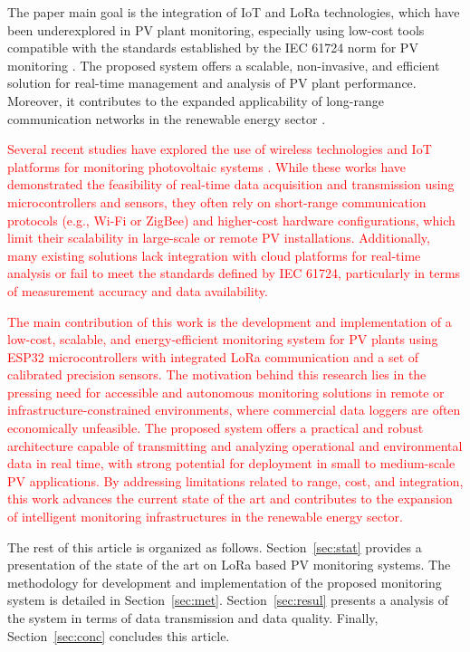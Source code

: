 The paper main goal is the integration of IoT and LoRa technologies, which have been underexplored in PV plant monitoring, especially using low-cost tools compatible with the standards established by the IEC 61724 norm for PV monitoring \cite{IEC61724}. The proposed system offers a scalable, non-invasive, and efficient solution for real-time management and analysis of PV plant performance. Moreover, it contributes to the expanded applicability of long-range communication networks in the renewable energy sector \cite{de2017monitoring,ansari2021review}.

\textcolor{red}{
Several recent studies have explored the use of wireless technologies and IoT platforms for monitoring photovoltaic systems \cite{dupont2018internet, pereira2019iot, liang2020performance, araripe2024monitoramento}. While these works have demonstrated the feasibility of real-time data acquisition and transmission using microcontrollers and sensors, they often rely on short-range communication protocols (e.g., Wi-Fi or ZigBee) and higher-cost hardware configurations, which limit their scalability in large-scale or remote PV installations. Additionally, many existing solutions lack integration with cloud platforms for real-time analysis or fail to meet the standards defined by IEC 61724, particularly in terms of measurement accuracy and data availability.
}

\textcolor{red}{
The main contribution of this work is the development and implementation of a low-cost, scalable, and energy-efficient monitoring system for PV plants using ESP32 microcontrollers with integrated LoRa communication and a set of calibrated precision sensors. The motivation behind this research lies in the pressing need for accessible and autonomous monitoring solutions in remote or infrastructure-constrained environments, where commercial data loggers are often economically unfeasible. The proposed system offers a practical and robust architecture capable of transmitting and analyzing operational and environmental data in real time, with strong potential for deployment in small to medium-scale PV applications. By addressing limitations related to range, cost, and integration, this work advances the current state of the art and contributes to the expansion of intelligent monitoring infrastructures in the renewable energy sector.
}

The rest of this article is organized as follows. Section~\ref{sec:stat} provides a presentation of the state of the art on LoRa based PV monitoring systems. The methodology for development and implementation of the proposed monitoring system is detailed in Section~\ref{sec:met}. Section~\ref{sec:resul} presents a analysis of the  system in terms of data transmission and data quality. Finally, Section~\ref{sec:conc} concludes this article.


